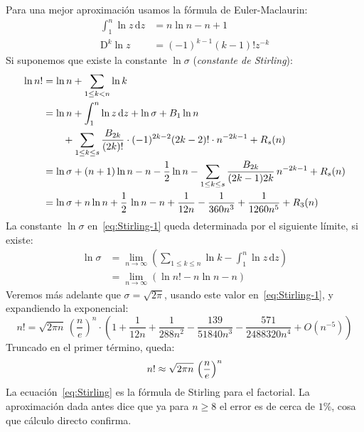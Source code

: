   Para una mejor aproximación usamos la fórmula de Euler-Maclaurin:
  \begin{align*}
    \int_1^n \ln z \, \mathrm{d} z
      &= n \ln n - n + 1 \\
    \mathrm{D}^k \ln z
      &= (-1)^{k - 1} (k - 1)! z^{-k}
  \end{align*}
  Si suponemos que existe la constante \(\ln \sigma\)
  (\emph{constante de Stirling}):%
  \begin{align}
    \ln n!
      &= \ln n + \sum_{1 \le k < n} \ln k \\
      &= \ln n + \int_1^n \ln z \, \mathrm{d} z + \ln \sigma
	   + B_1 \ln n \notag \\
      &\qquad
	   + \sum_{1 \le k \le s}
	       \frac{B_{2 k}}{(2 k)!}
		 \cdot (-1)^{2 k - 2} (2 k - 2)!
		 \cdot n^{- 2 k - 1}
	   + R_s(n) \notag \\
      &= \ln \sigma + (n + 1) \ln n - n
	   - \frac{1}{2} \ln n
	   - \sum_{1 \le k \le s}
	       \frac{B_{2 k}}{(2 k - 1) 2 k} \, n^{- 2 k - 1}
	   + R_s(n) \notag \\
      &= \ln \sigma + n \ln n + \frac{1}{2} \, \ln n - n
	   + \frac{1}{12 n}
	   - \frac{1}{360 n^3}
	   + \frac{1}{1260 n^5}
	   + R_3(n)
	      \label{eq:Stirling-1}
  \end{align}
  La constante \(\ln \sigma\)
  en~\eqref{eq:Stirling-1}
  queda determinada por el siguiente límite,
  si existe:
  \begin{align*}
    \ln \sigma
      &= \lim_{n \rightarrow \infty}
	   \left(
	     \sum_{1 \le k \le n}
	       \ln k - \int_1^n \ln z \, \mathrm{d} z
	   \right) \\
      &= \lim_{n \rightarrow \infty}
	   \left(
	     \ln n! - n \ln n - n
	   \right)
  \end{align*}
  Veremos más adelante que \(\sigma = \sqrt{2 \pi}\),
  usando este valor en~\eqref{eq:Stirling-1},
  y expandiendo la exponencial:
  \begin{equation}
    \label{eq:Stirling-asymptotic}
    n!
      = \sqrt{2 \pi n} \, \left( \frac{n}{e} \right)^n
	  \cdot \left(1
			+ \frac{1}{12 n}
			+ \frac{1}{288 n^2}
			- \frac{139}{51840 n^3}
			- \frac{571}{2488320 n^4}
			+ O(n^{-5})
		\right)
  \end{equation}
  Truncado en el primer término,
  queda:
  \begin{equation}
    \index{Stirling, formula de@Stirling, fórmula de|textbfhy}
    \label{eq:Stirling}
    n!
     \approx \sqrt{2 \pi n} \, \left( \frac{n}{e} \right)^n
  \end{equation}
  La ecuación~\eqref{eq:Stirling}
  es la fórmula de Stirling para el factorial.
  La aproximación dada antes dice que
  ya para \(n \ge 8\) el error es de cerca de \(1\)\%,
  cosa que cálculo directo confirma.

